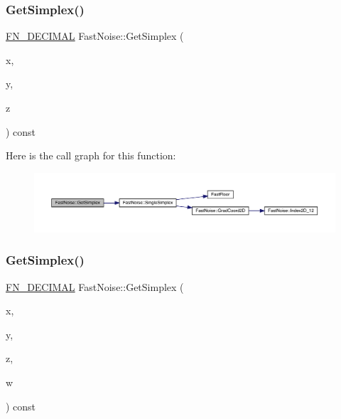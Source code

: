 \subsubsection{\texorpdfstring{Get\+Simplex()}{GetSimplex()}\hspace{0.1cm}{\footnotesize\ttfamily [2/3]}}
{\footnotesize\ttfamily \mbox{\hyperlink{_fast_noise_8h_a75a9ef6d2541c4921815b885bfd449c3}{F\+N\+\_\+\+D\+E\+C\+I\+M\+AL}} Fast\+Noise\+::\+Get\+Simplex (\begin{DoxyParamCaption}\item[{\mbox{\hyperlink{_fast_noise_8h_a75a9ef6d2541c4921815b885bfd449c3}{F\+N\+\_\+\+D\+E\+C\+I\+M\+AL}}}]{x,  }\item[{\mbox{\hyperlink{_fast_noise_8h_a75a9ef6d2541c4921815b885bfd449c3}{F\+N\+\_\+\+D\+E\+C\+I\+M\+AL}}}]{y,  }\item[{\mbox{\hyperlink{_fast_noise_8h_a75a9ef6d2541c4921815b885bfd449c3}{F\+N\+\_\+\+D\+E\+C\+I\+M\+AL}}}]{z }\end{DoxyParamCaption}) const}

Here is the call graph for this function\+:
\nopagebreak
\begin{figure}[H]
\begin{center}
\leavevmode
\includegraphics[width=350pt]{d1/dd8/class_fast_noise_a4ab5e306f72c428fef0e69be3166c07d_cgraph}
\end{center}
\end{figure}
\mbox{\label{class_fast_noise_a699fc06c0d6abe30627c2131606b6bfa}} 
\subsubsection{\texorpdfstring{Get\+Simplex()}{GetSimplex()}\hspace{0.1cm}{\footnotesize\ttfamily [3/3]}}
{\footnotesize\ttfamily \mbox{\hyperlink{_fast_noise_8h_a75a9ef6d2541c4921815b885bfd449c3}{F\+N\+\_\+\+D\+E\+C\+I\+M\+AL}} Fast\+Noise\+::\+Get\+Simplex (\begin{DoxyParamCaption}\item[{\mbox{\hyperlink{_fast_noise_8h_a75a9ef6d2541c4921815b885bfd449c3}{F\+N\+\_\+\+D\+E\+C\+I\+M\+AL}}}]{x,  }\item[{\mbox{\hyperlink{_fast_noise_8h_a75a9ef6d2541c4921815b885bfd449c3}{F\+N\+\_\+\+D\+E\+C\+I\+M\+AL}}}]{y,  }\item[{\mbox{\hyperlink{_fast_noise_8h_a75a9ef6d2541c4921815b885bfd449c3}{F\+N\+\_\+\+D\+E\+C\+I\+M\+AL}}}]{z,  }\item[{\mbox{\hyperlink{_fast_noise_8h_a75a9ef6d2541c4921815b885bfd449c3}{F\+N\+\_\+\+D\+E\+C\+I\+M\+AL}}}]{w }\end{DoxyParamCaption}) const}

